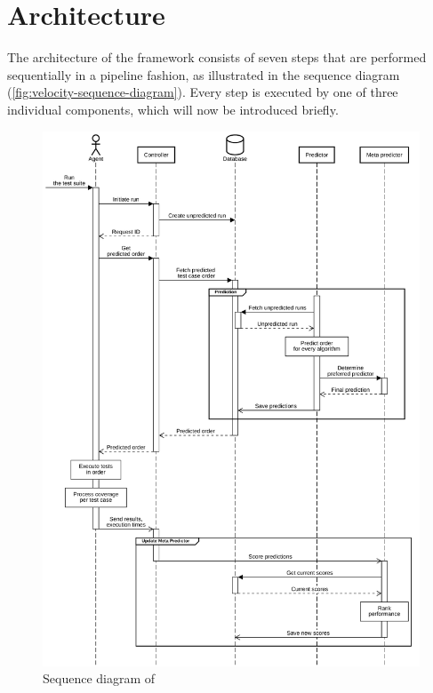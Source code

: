 
\section{Architecture}
The architecture of the \velocity{} framework consists of seven steps that are performed sequentially in a pipeline fashion, as illustrated in the sequence diagram (\autoref{fig:velocity-sequence-diagram}). Every step is executed by one of three individual components, which will now be introduced briefly.

\begin{figure}[htbp!]
	\centering
	\includegraphics[width=\textwidth]{assets/diagrams/sequence-diagram.pdf}
	\caption{Sequence diagram of \velocity{}}
	\label{fig:velocity-sequence-diagram}
\end{figure}


